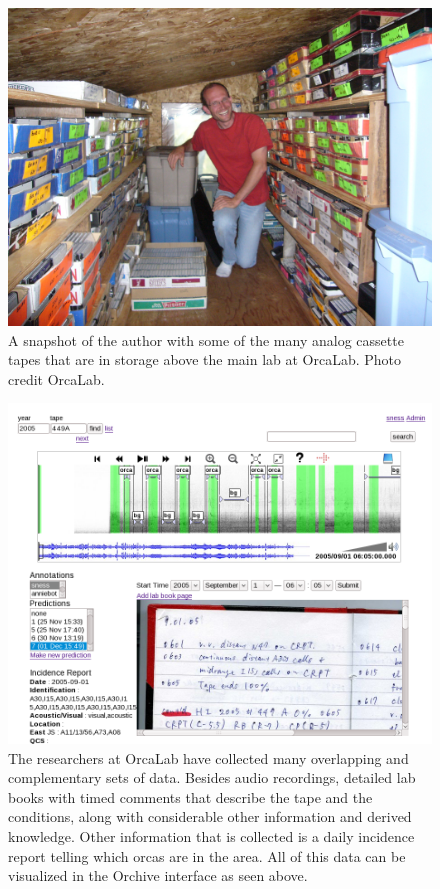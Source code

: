 \documentclass[12pt,oneside]{book}
\begin{document}
\begin{figure}[t]
\centering
\includegraphics[width=\columnwidth]{figures/orcaTapes}
\caption{A snapshot of the author with some of the many analog
  cassette tapes that are in storage above the main lab at
  OrcaLab. Photo credit OrcaLab.}
\label{fig:orcaTapes}
\end{figure}


\begin{figure}[t]
\centering
\includegraphics[width=\columnwidth]{figures/orchiveFull}
\caption{The researchers at OrcaLab have collected many overlapping
  and complementary sets of data.  Besides audio recordings, detailed
  lab books with timed comments that describe the tape and the
  conditions, along with considerable other information and derived
  knowledge.  Other information that is collected is a daily incidence
  report telling which orcas are in the area.  All of this data can be
  visualized in the Orchive interface as seen above.}
\label{fig:orchiveFull}
\end{figure}
\end{document}
